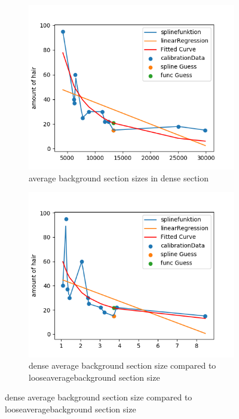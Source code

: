 \documentclass[german,a4paper, 12pt]{scrartcl}
\begin{document}
\begin{figure}[H]
	\medskip
	\begin{subfigure}{0.48\textwidth}
		\includegraphics[width=1.15\linewidth]{fig64/g09_avgbackgroundsectionsizes.png}
		\caption{average background section sizes in dense section} \label{fig:c}
	\end{subfigure}\hspace*{\fill}
	\begin{subfigure}{0.48\textwidth}
		\includegraphics[width=1.15\linewidth]{fig64/g10_denseavgbackgroundsizeVSlooseavg.png}
		\caption{dense average background section size compared to looseaveragebackground section size} \label{fig:d}
	\end{subfigure}
	

\end{figure}
\end{document}
